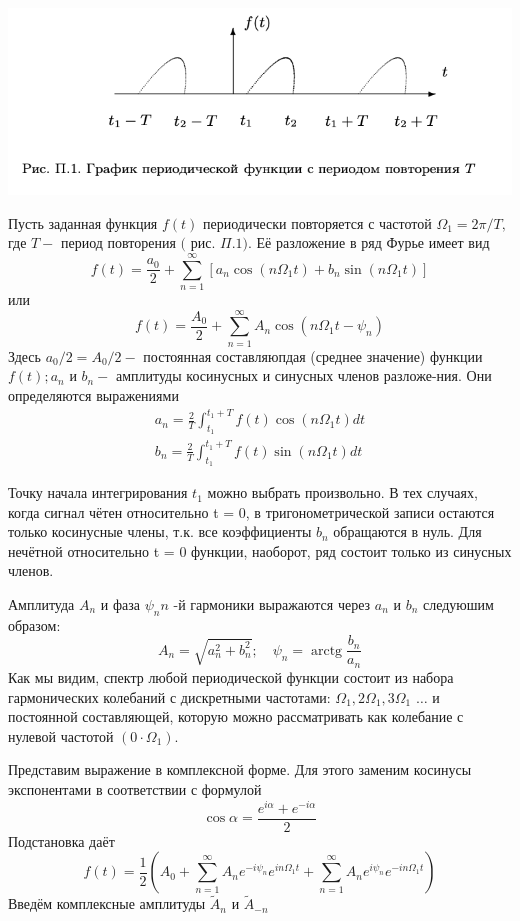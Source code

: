 \begin{center}
\includegraphics[width=0.7\linewidth]{1.jpg}\\
\end{center}

Пусть заданная функция $f(t)$ периодически повторяется с частотой $\Omega_{1}=2 \pi / T,$ где $T-$ период повторения $($ рис. $\Pi .1) .$ Её разложение в ряд Фурье имеет вид
$$
f(t)=\frac{a_{0}}{2}+\sum_{n=1}^{\infty}\left[a_{n} \cos \left(n \Omega_{1} t\right)+b_{n} \sin \left(n \Omega_{1} t\right)\right]
$$
или
$$
f(t)=\frac{A_{0}}{2}+\sum_{n=1}^{\infty} A_{n} \cos \left(n \Omega_{1} t-\psi_{n}\right)
$$
Здесь $a_{0} / 2=A_{0} / 2-$ постоянная составляюпдая (среднее значение) функции $f(t) ; a_{n}$ и $b_{n}-$ амплитуды косинусных и синусных членов разложе-ния. Они определяются выражениями
$$
\begin{array}{l}
a_{n}=\frac{2}{T} \int_{t_{1}}^{t_{1}+T} f(t) \cos \left(n \Omega_{1} t\right) d t \\
b_{n}=\frac{2}{T} \int_{t_{1}}^{t_{1}+T} f(t) \sin \left(n \Omega_{1} t\right) d t
\end{array}
$$

Точку начала интегрирования $t_1$ можно выбрать произвольно.
В тех случаях, когда сигнал чётен относительно t = 0, в тригонометрической записи остаются только косинусные члены, т.к. все коэффициенты $b_n$ обращаются в нуль. Для нечётной относительно t = 0 функции, наоборот, ряд состоит только из синусных членов.

Амплитуда $A_{n}$ и фаза $\psi_{n} n$ -й гармоники выражаются через $a_{n}$ и $b_{n}$ следуюшим образом:
$$
A_{n}=\sqrt{a_{n}^{2}+b_{n}^{2}} ; \quad \psi_{n}=\operatorname{arctg} \frac{b_{n}}{a_{n}}
$$
Как мы видим, спектр любой периодической функции состоит из набора гармонических колебаний с дискретными частотами: $\Omega_{1}, 2 \Omega_{1}, 3 \Omega_{1}$ $\ldots$ и постоянной составляющей, которую можно рассматривать как колебание с нулевой частотой $\left(0 \cdot \Omega_{1}\right) .$

Представим выражение в комплексной форме. Для этого заменим косинусы экспонентами в соответствии с формулой
$$
\cos \alpha=\frac{e^{i \alpha}+e^{-i \alpha}}{2}
$$
Подстановка даёт
$$
f(t)=\frac{1}{2}\left(A_{0}+\sum_{n=1}^{\infty} A_{n} e^{-i \psi_{n}} e^{i n \Omega_{1} t}+\sum_{n=1}^{\infty} A_{n} e^{i \psi_{n}} e^{-i n \Omega_{1} t}\right)
$$
Введём комплексные амплитуды $\tilde{A}_{n}$ и $\tilde{A}_{-n}$

